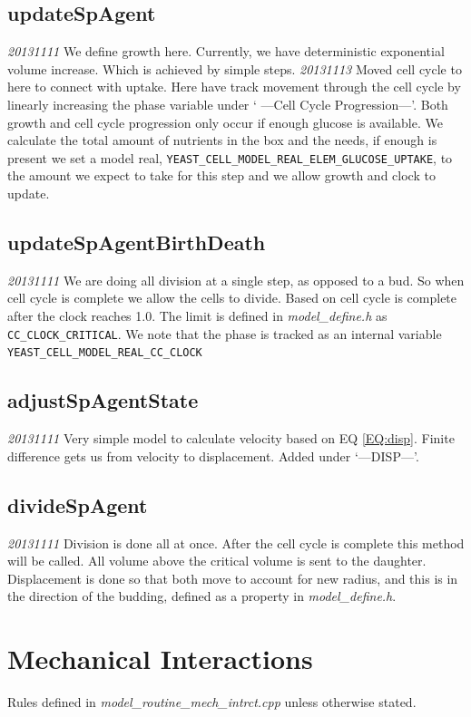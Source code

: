\documentclass{article}
\begin{document}
{\subsection{updateSpAgent}
\emph{20131111} We define growth here.  
Currently, we have deterministic exponential volume increase.
Which is achieved by simple steps.  
\emph{20131113} Moved cell cycle to here to connect with uptake.
Here have track movement through the cell cycle by linearly increasing the phase variable under ` ---Cell Cycle Progression---'.
Both growth and cell cycle progression only occur if enough glucose is available.
We calculate the total amount of nutrients in the box and the needs,
if enough is present we set a model real, \texttt{YEAST\_CELL\_MODEL\_REAL\_ELEM\_GLUCOSE\_UPTAKE},
to the amount we expect to take for this step and we allow growth and clock to update.



\subsection{updateSpAgentBirthDeath }
\emph{20131111} We are doing all division at a single step,
as opposed to a bud.
So when cell cycle is complete we allow the cells to divide.
Based on \cite{Charvin2009} cell cycle is complete after the clock reaches 1.0.
The limit is defined in \textit{model\_define.h} as \texttt{CC\_CLOCK\_CRITICAL}.
We note that the phase is tracked as an internal variable \texttt{YEAST\_CELL\_MODEL\_REAL\_CC\_CLOCK}

\subsection{adjustSpAgentState}
\emph{20131111} Very simple model to calculate velocity based on EQ \ref{EQ:disp}.
Finite difference gets us from velocity to displacement.
Added under `---DISP---'.

\subsection{divideSpAgent}
\emph{20131111} Division is done all at once.  
After the cell cycle is complete this method will be called.
All volume above the critical volume is sent to the daughter.
Displacement is done so that both move to account for new radius, 
and this is in the direction of the budding, defined as a property in \textit{model\_define.h}.
 

\section{Mechanical Interactions}
Rules defined in \textit{model\_routine\_mech\_intrct.cpp} unless otherwise stated.

}
\end{document}
